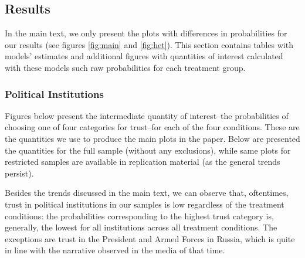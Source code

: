 \documentclass[11pt, ngerman,english,a4]{article}
\begin{document}
\subsection{Results}

In the main text, we only present the plots with differences in probabilities for our results (see figures \ref{fig:main} and \ref{fig:het}). This section contains tables with models' estimates and additional figures with quantities of interest calculated with these models such raw probabilities for each treatment group. 

\subsubsection*{Political Institutions}




\clearpage



\clearpage

Figures below present the intermediate quantity of interest--the probabilities of choosing one of four categories for trust--for each of the four conditions. These are the quantities we use to produce the main plots in the paper. Below are presented the quantities for the full sample (without any exclusions), while same plots for restricted samples are available in replication material (as the general trends persist). 

Besides the trends discussed in the main text, we can observe that, oftentimes, trust in political institutions in our samples is low regardless of the treatment conditions: the probabilities corresponding to the highest trust category is, generally, the lowest for all institutions across all treatment conditions. The exceptions are trust in the President and Armed Forces in Russia, which is quite in line with the narrative observed in the media of that time. 
\end{document}
